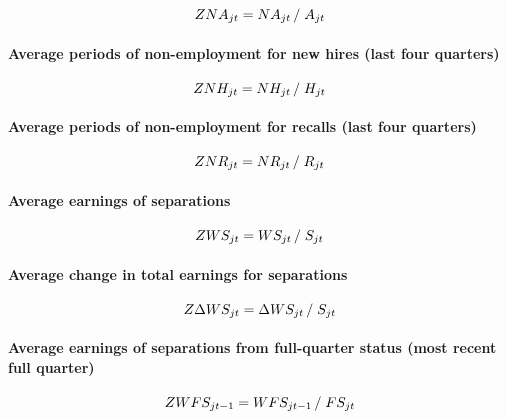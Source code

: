 \begin{equation}
ZNA_{jt} = {NA_{jt} } \left/ {\vphantom {{NA_{jt} } {A_{jt} }}} \right. {%
A_{jt} }
\end{equation}

\paragraph{Average periods of non-employment for new hires (last four
quarters)}

\begin{equation}
ZNH_{jt} = {NH_{jt} } \left/ {\vphantom {{NH_{jt} } {H_{jt} }}} \right. {%
H_{jt} }
\end{equation}

\paragraph{Average periods of non-employment for recalls (last four quarters)%
}

\begin{equation}
ZNR_{jt} = {NR_{jt} } \left/ {\vphantom {{NR_{jt} } {R_{jt} }}} \right. {%
R_{jt} }
\end{equation}

\paragraph{Average earnings of separations}

\begin{equation}
ZWS_{jt} = {WS_{jt} } \left/ {\vphantom {{WS_{jt} } {S_{jt} }}} \right. {%
S_{jt} }
\end{equation}

\paragraph{Average change in total earnings for separations}

\begin{equation}
Z\Delta WS_{jt} = {\Delta WS_{jt} } \left/ {\vphantom {{\Delta WS_{jt} }
{S_{jt} }}} \right. {S_{jt} }
\end{equation}

\paragraph{Average earnings of separations from full-quarter status (most
recent full quarter)}

\begin{equation}
ZWFS_{jt - 1} = {WFS_{jt - 1} } \left/ {\vphantom {{WFS_{jt - 1} } {FS_{jt}
}}} \right. {FS_{jt} }
\end{equation}

